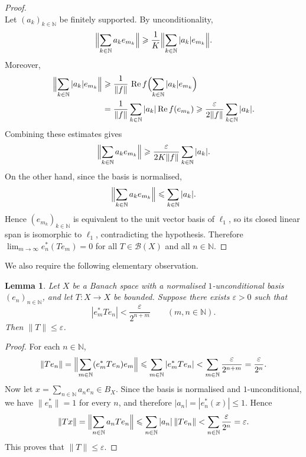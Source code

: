 \documentclass[11pt]{amsart}
\theoremstyle{plain}
\newtheorem{lemma}[theorem]{Lemma}
\theoremstyle{definition}
\numberwithin{equation}{section}
\newcommand{\norm}[1]{\lVert #1 \rVert}
\newcommand{\Bop}{\mathcal{B}}
\newcommand{\N}{\mathbb{N}}
\renewcommand{\le}{\leqslant}
\renewcommand{\ge}{\geqslant}
\begin{document}
\begin{proof}
\[\]
Let $(a_k)_{k\in\N}$ be finitely supported. By unconditionality,
\[
    \Bigl\|\sum_{k\in\N} a_k e_{m_k}\Bigr\|
    \ge \frac1K \Bigl\|\sum_{k\in\N} |a_k|e_{m_k}\Bigr\|.
\]
Moreover,
\[
\begin{aligned}
    \Bigl\|\sum_{k\in\N} |a_k|e_{m_k}\Bigr\|
    &\ge \frac1{\|f\|}\,
       \operatorname{Re} f\Bigl(\sum_{k\in\N}|a_k|e_{m_k}\Bigr)  \\
    &= \frac1{\|f\|}\sum_{k\in\N}|a_k|\operatorname{Re} f(e_{m_k})
    \ge \frac{\varepsilon}{2\|f\|}\sum_{k\in\N}|a_k|.
\end{aligned}
\]
Combining these estimates gives
\[
    \Bigl\|\sum_{k\in\N} a_k e_{m_k}\Bigr\|
    \ge \frac{\varepsilon}{2K\|f\|}\sum_{k\in\N}|a_k|.
\]
On the other hand, since the basis is normalised,
\[
    \Bigl\|\sum_{k \in \N} a_k e_{m_k}\Bigr\|
    \le \sum_{k \in \N} |a_k|.
\]
Hence $(e_{m_k})_{k \in \N}$ is equivalent to the unit vector basis of $\ell_1$, so its
closed linear span is isomorphic to $\ell_1$, contradicting the hypothesis.
Therefore $\lim_{m\to\infty} e_n^*(T e_m)=0$ for all $T\in \Bop (X)$ and all
$n\in\N$.
\end{proof}

We also require the following elementary observation.

\begin{lemma}\label{lmm: small-norm}
Let $X$ be a Banach space with a normalised $1$-unconditional basis $(e_n)_{n\in\N}$,
and let $T\colon X\to X$ be bounded.
Suppose there exists $\varepsilon>0$ such that
\[
|e_m^*Te_n|<\frac{\varepsilon}{2^{n+m}}
\qquad(m,n\in\N).
\]
Then $\norm{T}\le \varepsilon$.
\end{lemma}

\begin{proof}
For each $n\in\N$,
\[
\norm{Te_n}
= \Bigl\|\sum_{m\in\N}(e_m^*Te_n)e_m\Bigr\|
\le \sum_{m\in\N}|e_m^*Te_n|
< \sum_{m\in\N}\frac{\varepsilon}{2^{n+m}}
=\frac{\varepsilon}{2^n}.
\]
Now let $x=\sum_{n\in\N} a_n e_n\in B_X$. Since the basis is normalised and $1$-unconditional,
we have $\norm{e_n^*}=1$ for every $n$, and therefore
$|a_n|=|e_n^*(x)|\le 1$.
Hence
\[
\norm{Tx}
=\Bigl\|\sum_{n\in\N} a_n Te_n\Bigr\|
\le \sum_{n\in\N}|a_n|\,\norm{Te_n}
< \sum_{n\in\N}\frac{\varepsilon}{2^n}
=\varepsilon.
\]
This proves that $\norm{T}\le \varepsilon$.
\end{proof}
\end{document}

